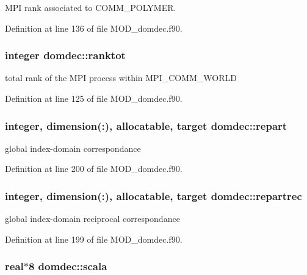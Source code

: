 M\-P\-I rank associated to C\-O\-M\-M\-\_\-\-P\-O\-L\-Y\-M\-E\-R. 



Definition at line 136 of file M\-O\-D\-\_\-domdec.\-f90.

\hypertarget{classdomdec_a003bab60bea2de6201a9182da660c5c8}{
\subsubsection[{ranktot}]{\setlength{\rightskip}{0pt plus 5cm}integer domdec\-::ranktot}}\label{classdomdec_a003bab60bea2de6201a9182da660c5c8}


total rank of the M\-P\-I process within M\-P\-I\-\_\-\-C\-O\-M\-M\-\_\-\-W\-O\-R\-L\-D 



Definition at line 125 of file M\-O\-D\-\_\-domdec.\-f90.

\hypertarget{classdomdec_aeab8c3ef2b14a507aa871f5e49d4a5f6}{
\subsubsection[{repart}]{\setlength{\rightskip}{0pt plus 5cm}integer, dimension(\-:), allocatable, target domdec\-::repart}}\label{classdomdec_aeab8c3ef2b14a507aa871f5e49d4a5f6}


global index-\/domain correspondance 



Definition at line 200 of file M\-O\-D\-\_\-domdec.\-f90.

\hypertarget{classdomdec_aeabaca57aab399a825da41e1915339ab}{
\subsubsection[{repartrec}]{\setlength{\rightskip}{0pt plus 5cm}integer, dimension(\-:), allocatable, target domdec\-::repartrec}}\label{classdomdec_aeabaca57aab399a825da41e1915339ab}


global index-\/domain reciprocal correspondance 



Definition at line 199 of file M\-O\-D\-\_\-domdec.\-f90.

\hypertarget{classdomdec_a1faa8e227097e532c46ee84194d04b47}{
\subsubsection[{scala}]{\setlength{\rightskip}{0pt plus 5cm}real$\ast$8 domdec\-::scala}}\label{classdomdec_a1faa8e227097e532c46ee84194d04b47}


